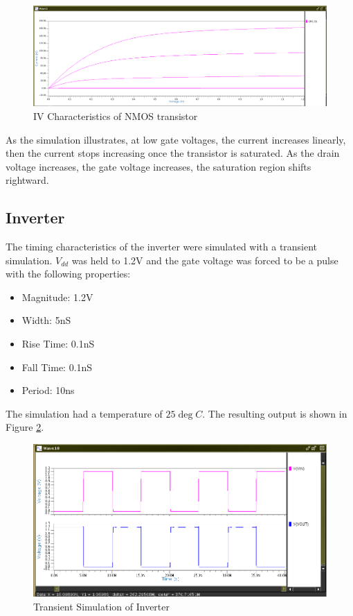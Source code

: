 \documentclass[11pt]{article}
\begin{document}
		\begin{figure}[H]
			\centering
			\includegraphics[width=0.7\linewidth]{"Pictures/Transistor IV Properties"}
			\caption[]{IV Characteristics of NMOS transistor}
			\label{fig:transistor-iv-properties}
		\end{figure}
	
		As the simulation illustrates, at low gate voltages, the current increases linearly, then the current stops increasing once the transistor is saturated. As the drain voltage increases, the gate voltage increases, the saturation region shifts rightward. 
	
	
	\subsection{Inverter}
	
		The timing characteristics of the inverter were simulated with a transient simulation. $V_{dd}$ was held to 1.2V and the gate voltage was forced to be a pulse with the following properties:
		\begin{itemize}
			\item Magnitude: 1.2V
			\item Width: 5nS
			\item Rise Time: 0.1nS
			\item Fall Time: 0.1nS
			\item Period: 10ns
		\end{itemize}
	
		The simulation had a temperature of $25\deg C$. The resulting output is shown in Figure \ref{fig:transient-sim}. 
	
		\begin{figure}[H]
			\centering
			\includegraphics[width=0.7\linewidth]{"Pictures/Transient Sim"}
			\caption[Transient Simulation of Inverter]{Transient Simulation of Inverter}
			\label{fig:transient-sim}
		\end{figure}
		
\end{document}
